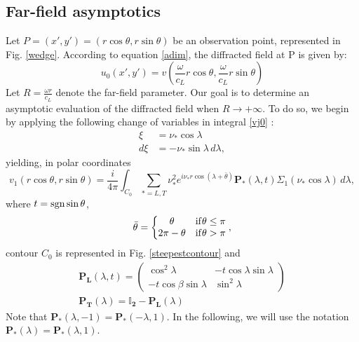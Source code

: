 \subsection{Far-field asymptotics}
\label{C3:farfield}
Let $P=(x',y')=(r\cos\theta,r\sin\theta)$ be an observation point, represented in Fig. \ref{wedge}. According to equation \eqref{adim}, the diffracted field at P is given by:
\begin{equation}
u_0(x',y')=v(\frac{\omega}{c_L}r\cos\theta,\frac{\omega}{c_L}r\sin\theta)
\end{equation}
Let $R=\frac{\omega r}{c_L}$ denote the far-field parameter. Our goal is to determine an asymptotic evaluation of the diffracted field when $R\rightarrow +\infty$. To do so, we begin by applying the following change of variables in integral \eqref{vj0} :
\begin{equation}
\begin{split}
 \xi&=\nu_*\cos\lambda \\
 d\xi&=-\nu_*\sin\lambda\, d\lambda,
\end{split}
\label{changevar2}
\end{equation}
yielding, in polar coordinates
\begin{equation}
v_1(r\cos\theta,r\sin\theta)=\frac{i}{4\pi} \int_{C_0}\sum_{*=L,T}\nu_*^2 e^{i\nu_*r\cos(\lambda+\bar{\theta})}\mathbf{ P_*}(\lambda,t)\Sigma_1(\nu_*\cos\lambda) \, d \lambda,
\label{v1pol}
\end{equation}
where $t=\rm sgn \sin \theta$,
\begin{equation}
\bar{\theta}=\left\{
\begin{matrix}
\theta & \rm if \theta \leq \pi \\
2\pi-\theta & \rm if \theta>\pi
\end{matrix}
\right. ,
\label{C3:thetatilde}
\end{equation}
contour $C_0$ is represented in Fig. \ref{steepestcontour} and
\begin{gather}
\mathbf{P_L}(\lambda,t)=
\begin{pmatrix}
\cos^2\lambda & -t\cos\lambda\sin\lambda \\
-t\cos\beta\sin\lambda & \sin^2\lambda
\end{pmatrix}\\
\mathbf{P_T}(\lambda)=\mathbf{\mathbb{I}_2}-\mathbf{P_L}(\lambda)
\end{gather}
Note that $\mathbf{P_*}(\lambda,-1)=\mathbf{P_*}(-\lambda,1)$. In the following, we will use the notation $\mathbf{P_*}(\lambda)=\mathbf{P_*}(\lambda,1)$.

